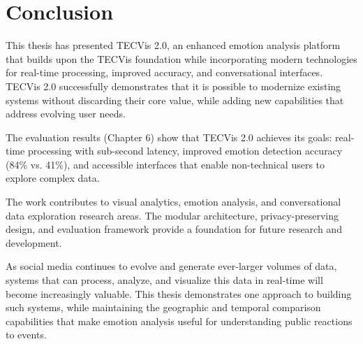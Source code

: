 
\section{Conclusion}

This thesis has presented TECVis 2.0, an enhanced emotion analysis platform that builds upon the TECVis foundation while incorporating modern technologies for real-time processing, improved accuracy, and conversational interfaces. TECVis 2.0 successfully demonstrates that it is possible to modernize existing systems without discarding their core value, while adding new capabilities that address evolving user needs.

\vspace{3mm}
The evaluation results (Chapter 6) show that TECVis 2.0 achieves its goals: real-time processing with sub-second latency, improved emotion detection accuracy (84\% vs. 41\%), and accessible interfaces that enable non-technical users to explore complex data.

The work contributes to visual analytics, emotion analysis, and conversational data exploration research areas. The modular architecture, privacy-preserving design, and evaluation framework provide a foundation for future research and development.

As social media continues to evolve and generate ever-larger volumes of data, systems that can process, analyze, and visualize this data in real-time will become increasingly valuable. This thesis demonstrates one approach to building such systems, while maintaining the geographic and temporal comparison capabilities that make emotion analysis useful for understanding public reactions to events.


\let\cleardoublepage\clearpage

